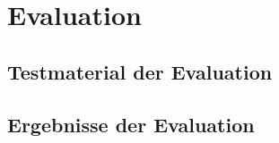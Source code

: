 \documentclass[Bachelorarbeit.tex]{subfiles}
\begin{document}
\chapter{Evaluation}
\label{anhangEvaluation}

\section{Testmaterial der Evaluation}
\label{anhangTestmaterial}

\section{Ergebnisse der Evaluation}
\label{anhangErgebnisse}
\end{document}
